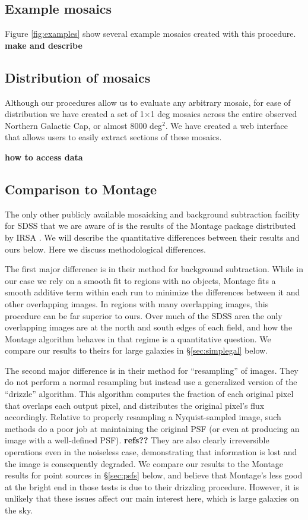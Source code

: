 \documentclass[10pt,preprint]{aastex}
\begin{document}
\subsection{Example mosaics}

Figure \ref{fig:examples} show several example mosaics created with
this procedure.  {\bf make and describe}

\subsection{Distribution of mosaics}

Although our procedures allow us to evaluate any arbitrary mosaic, for
ease of distribution we have created a set of 1$\times$1 deg mosaics
across the entire observed Northern Galactic Cap, or almost 8000
deg$^2$. We have created a web interface that allows users to easily
extract sections of these mosaics.

{\bf how to access data}

\subsection{Comparison to Montage}

The only other publicly available mosaicking and background
subtraction facility for SDSS that we are aware of is the results of
the Montage package distributed by IRSA \citep{berriman03a,berriman04a}. We will describe
the quantitative differences between their results and ours below.
Here we discuss methodological differences.

The first major difference is in their method for background
subtraction. While in our case we rely on a smooth fit to regions with
no objects, Montage fits a smooth additive term within each run to
minimize the differences between it and other overlapping images. In
regions with many overlapping images, this procedure can be far
superior to ours. Over much of the SDSS area the only overlapping
images are at the north and south edges of each field, and how the
Montage algorithm behaves in that regime is a quantitative
question. We compare our results to theirs for large galaxies in
\S\ref{sec:simplegal} below.

The second major difference is in their method for ``resampling'' of
images. They do not perform a normal resampling but instead use a
generalized version of the ``drizzle'' algorithm. This algorithm
computes the fraction of each original pixel that overlaps each output
pixel, and distributes the original pixel's flux accordingly. Relative
to properly resampling a Nyquist-sampled image, such methods do a poor
job at maintaining the original PSF (or even at producing an image
with a well-defined PSF). {\bf refs??} They are also clearly
irreversible operations even in the noiseless case, demonstrating that
information is lost and the image is consequently degraded. We compare
our results to the Montage results for point sources in
\S\ref{sec:psfs} below, and believe that Montage's less good
at the bright end in those tests is due to their drizzling
procedure. However, it is unlikely that these issues affect our main
interest here, which is large galaxies on the sky.
\end{document}
